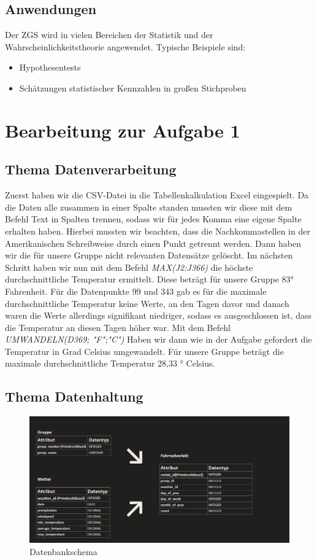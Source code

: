\documentclass[a4paper,11pt]{article}
\begin{document}
\subsection{Anwendungen}
Der ZGS wird in vielen Bereichen der Statistik und der Wahrscheinlichkeitstheorie angewendet. Typische Beispiele sind:
\begin{itemize}
    \item Hypothesentests
    \item Sch\"atzungen statistischer Kennzahlen in großen Stichproben
\end{itemize}

\section{Bearbeitung zur Aufgabe 1}

\subsection{Thema Datenverarbeitung}
Zuerst haben wir die CSV-Datei in die Tabellenkalkulation Excel eingespielt. Da die Daten alle zusammen in einer Spalte standen mussten wir diese mit dem Befehl Text in Spalten trennen, sodass wir für jedes Komma eine eigene Spalte erhalten haben. Hierbei mussten wir beachten, dass die Nachkommastellen in der Amerikanischen Schreibweise durch einen Punkt getrennt werden. Dann haben wir die für unsere Gruppe nicht relevanten Datensätze gelöscht. Im nächsten Schritt haben wir nun mit dem Befehl \textit{MAX(J2:J366)} die höchste durchschnittliche Temperatur ermittelt. Diese beträgt für unsere Gruppe 83° Fahrenheit. Für die Datenpunkte 99 und 343 gab es für die maximale durchschnittliche Temperatur keine Werte, an den Tagen davor und danach waren die Werte allerdings signifikant niedriger, sodass es ausgeschlossen ist, dass die Temperatur an diesen Tagen höher war. Mit dem Befehl \textit{UMWANDELN(D369; "F";"C")} Haben wir dann wie in der Aufgabe gefordert die Temperatur in Grad Celsius umgewandelt. Für unsere Gruppe beträgt die maximale durchschnittliche Temperatur 28,33 ° Celsius. 

\subsection{Thema Datenhaltung}
\begin{figure}[h]
\centering
\includegraphics[scale=.4]{Datenbankschema.png}
\caption{Datenbankschema}
\label{fig:meine-grafik}
\end{figure}
\end{document}
